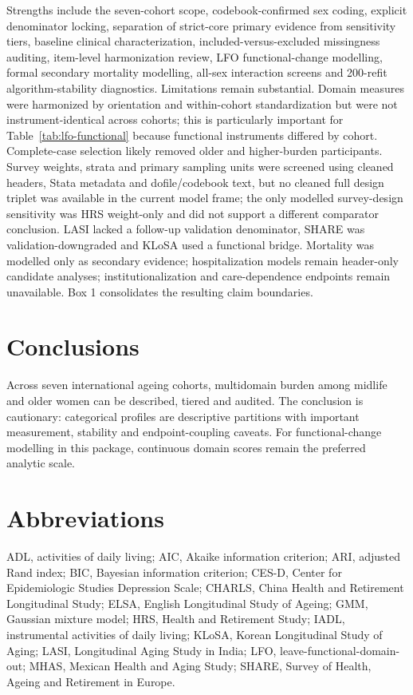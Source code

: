 \documentclass[pdflatex,sn-vancouver-num]{sn-jnl}
\begin{document}
Strengths include the seven-cohort scope, codebook-confirmed sex coding, explicit denominator locking, separation of strict-core primary evidence from sensitivity tiers, baseline clinical characterization, included-versus-excluded missingness auditing, item-level harmonization review, LFO functional-change modelling, formal secondary mortality modelling, all-sex interaction screens and 200-refit algorithm-stability diagnostics. Limitations remain substantial. Domain measures were harmonized by orientation and within-cohort standardization but were not instrument-identical across cohorts; this is particularly important for Table~\ref{tab:lfo-functional} because functional instruments differed by cohort. Complete-case selection likely removed older and higher-burden participants. Survey weights, strata and primary sampling units were screened using cleaned headers, Stata metadata and dofile/codebook text, but no cleaned full design triplet was available in the current model frame; the only modelled survey-design sensitivity was HRS weight-only and did not support a different comparator conclusion. LASI lacked a follow-up validation denominator, SHARE was validation-downgraded and KLoSA used a functional bridge. Mortality was modelled only as secondary evidence; hospitalization models remain header-only candidate analyses; institutionalization and care-dependence endpoints remain unavailable. Box 1 consolidates the resulting claim boundaries.

\section{Conclusions}\label{sec:conclusions}

Across seven international ageing cohorts, multidomain burden among midlife and older women can be described, tiered and audited. The conclusion is cautionary: categorical profiles are descriptive partitions with important measurement, stability and endpoint-coupling caveats. For functional-change modelling in this package, continuous domain scores remain the preferred analytic scale.

\section*{Abbreviations}

ADL, activities of daily living; AIC, Akaike information criterion; ARI, adjusted Rand index; BIC, Bayesian information criterion; CES-D, Center for Epidemiologic Studies Depression Scale; CHARLS, China Health and Retirement Longitudinal Study; ELSA, English Longitudinal Study of Ageing; GMM, Gaussian mixture model; HRS, Health and Retirement Study; IADL, instrumental activities of daily living; KLoSA, Korean Longitudinal Study of Aging; LASI, Longitudinal Aging Study in India; LFO, leave-functional-domain-out; MHAS, Mexican Health and Aging Study; SHARE, Survey of Health, Ageing and Retirement in Europe.
\end{document}
